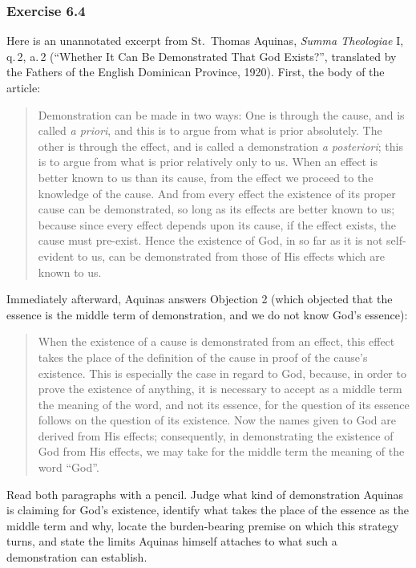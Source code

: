 \subsubsection*{Exercise 6.4}
Here is an unannotated excerpt from St.\ Thomas Aquinas, \emph{Summa Theologiae} I, q.\,2, a.\,2 (``Whether It Can Be Demonstrated That God Exists?'', translated by the Fathers of the English Dominican Province, 1920). First, the body of the article:

\begin{quote}
Demonstration can be made in two ways: One is through the cause, and is called \emph{a priori}, and this is to argue from what is prior absolutely. The other is through the effect, and is called a demonstration \emph{a posteriori}; this is to argue from what is prior relatively only to us. When an effect is better known to us than its cause, from the effect we proceed to the knowledge of the cause. And from every effect the existence of its proper cause can be demonstrated, so long as its effects are better known to us; because since every effect depends upon its cause, if the effect exists, the cause must pre-exist. Hence the existence of God, in so far as it is not self-evident to us, can be demonstrated from those of His effects which are known to us.
\end{quote}

Immediately afterward, Aquinas answers Objection 2 (which objected that the essence is the middle term of demonstration, and we do not know God's essence):

\begin{quote}
When the existence of a cause is demonstrated from an effect, this effect takes the place of the definition of the cause in proof of the cause's existence. This is especially the case in regard to God, because, in order to prove the existence of anything, it is necessary to accept as a middle term the meaning of the word, and not its essence, for the question of its essence follows on the question of its existence. Now the names given to God are derived from His effects; consequently, in demonstrating the existence of God from His effects, we may take for the middle term the meaning of the word ``God''.
\end{quote}

Read both paragraphs with a pencil. Judge what kind of demonstration Aquinas is claiming for God's existence, identify what takes the place of the essence as the middle term and why, locate the burden-bearing premise on which this strategy turns, and state the limits Aquinas himself attaches to what such a demonstration can establish.


